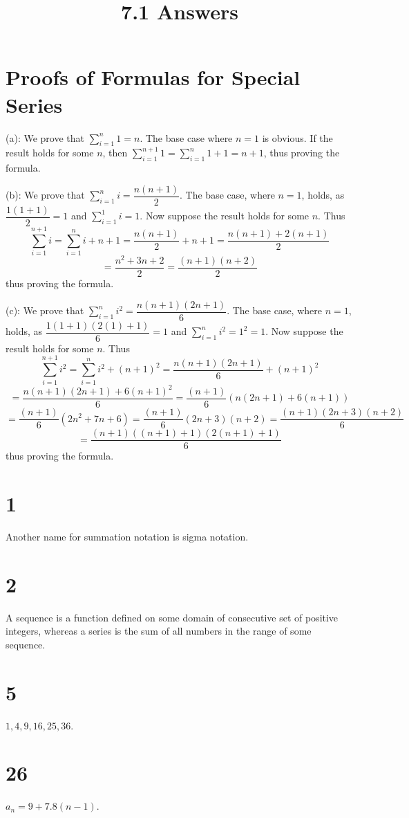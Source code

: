 \documentclass{article}
\title{7.1 Answers}
\theoremstyle{definition}
\newcommand{\?}{\stackrel{?}{=}}
\begin{document}
\maketitle

\section*{Proofs of Formulas for Special Series}
(a): We prove that $\sum_{i=1}^n1=n$. The base case where $n=1$ is obvious. If the result holds for some $n$, then 
$\sum_{i=1}^{n+1}1=\sum_{i=1}^n1+1=n+1$, thus proving the formula.


(b): We prove that $\sum_{i=1}^ni=\dfrac{n(n+1)}{2}$. The base case, where $n=1$, holds, as 
$\dfrac{1(1+1)}{2}=1$ and $\sum_{i=1}^1i=1$. Now suppose the result holds for some $n$. 
Thus \[ \sum_{i=1}^{n+1}i=\sum_{i=1}^ni+n+1=\dfrac{n(n+1)}{2}+n+1=\dfrac{n(n+1)+2(n+1)}{2} \]
\[ =\dfrac{n^2+3n+2}{2}=\dfrac{(n+1)(n+2)}{2} \] thus proving the formula.


(c): We prove that $\sum_{i=1}^ni^2=\dfrac{n(n+1)(2n+1)}{6}$. The base case, where $n=1$, holds, as
$\dfrac{1(1+1)(2(1)+1)}{6}=1$ and $\sum_{i=1}^ni^2=1^2=1$. Now suppose the result holds for some $n$.
Thus \[ \sum_{i=1}^{n+1}i^2=\sum_{i=1}^ni^2+(n+1)^2=\dfrac{n(n+1)(2n+1)}{6}+(n+1)^2 \]
\[ =\dfrac{n(n+1)(2n+1)+6(n+1)^2}{6}=\dfrac{(n+1)}{6}(n(2n+1)+6(n+1)) \]
\[ =\dfrac{(n+1)}{6}(2n^2+7n+6)=\dfrac{(n+1)}{6}(2n+3)(n+2)=\dfrac{(n+1)(2n+3)(n+2)}{6} \]
\[ =\dfrac{(n+1)((n+1)+1)(2(n+1)+1)}{6} \] thus proving the formula.

\section*{1}
Another name for summation notation is sigma notation.

\section*{2}
A sequence is a function defined on some domain of consecutive set of positive integers, whereas a series is the sum of all numbers in the range of some sequence.

\section*{5}
$1,4,9,16,25,36$.

\section*{26}
$a_n=9+7.8(n-1)$.
\end{document}
